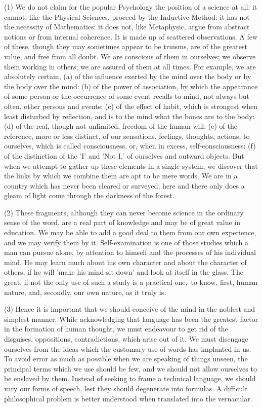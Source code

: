 (1) We do not claim for the popular Psychology the position of a science
at all; it cannot, like the Physical Sciences, proceed by the Inductive
Method: it has not the necessity of Mathematics: it does not, like
Metaphysic, argue from abstract notions or from internal coherence. It
is made up of scattered observations. A few of these, though they may
sometimes appear to be truisms, are of the greatest value, and free
from all doubt. We are conscious of them in ourselves; we observe them
working in others; we are assured of them at all times. For example, we
are absolutely certain, (a) of the influence exerted by the mind over
the body or by the body over the mind: (b) of the power of association,
by which the appearance of some person or the occurrence of some event
recalls to mind, not always but often, other persons and events: (c)
of the effect of habit, which is strongest when least disturbed by
reflection, and is to the mind what the bones are to the body: (d) of
the real, though not unlimited, freedom of the human will: (e) of the
reference, more or less distinct, of our sensations, feelings, thoughts,
actions, to ourselves, which is called consciousness, or, when in
excess, self-consciousness: (f) of the distinction of the 'I' and 'Not
I,' of ourselves and outward objects. But when we attempt to gather up
these elements in a single system, we discover that the links by which
we combine them are apt to be mere words. We are in a country which
has never been cleared or surveyed; here and there only does a gleam of
light come through the darkness of the forest.

(2) These fragments, although they can never become science in the
ordinary sense of the word, are a real part of knowledge and may be of
great value in education. We may be able to add a good deal to them from
our own experience, and we may verify them by it. Self-examination
is one of those studies which a man can pursue alone, by attention to
himself and the processes of his individual mind. He may learn much
about his own character and about the character of others, if he will
'make his mind sit down' and look at itself in the glass. The great, if
not the only use of such a study is a practical one,--to know, first,
human nature, and, secondly, our own nature, as it truly is.

(3) Hence it is important that we should conceive of the mind in the
noblest and simplest manner. While acknowledging that language has been
the greatest factor in the formation of human thought, we must endeavour
to get rid of the disguises, oppositions, contradictions, which
arise out of it. We must disengage ourselves from the ideas which the
customary use of words has implanted in us. To avoid error as much as
possible when we are speaking of things unseen, the principal terms
which we use should be few, and we should not allow ourselves to be
enslaved by them. Instead of seeking to frame a technical language,
we should vary our forms of speech, lest they should degenerate into
formulas. A difficult philosophical problem is better understood when
translated into the vernacular.

